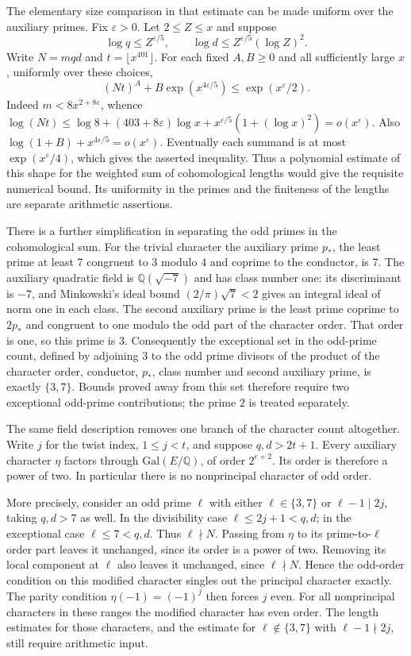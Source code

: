\documentclass[11pt]{amsart}
\theoremstyle{definition}
\theoremstyle{remark}
\begin{document}
The elementary size comparison in that estimate can be made uniform
over the auxiliary primes. Fix $\varepsilon>0$. Let $2\le Z\le x$ and
suppose
\[
 \log q\le Z^{\varepsilon/5},\qquad
 \log d\le Z^{\varepsilon/5}(\log Z)^2 .
\]
Write $N=mqd$ and $t=\lfloor x^{401}\rfloor$. For each fixed $A,B\ge0$
and all sufficiently large $x$, uniformly over these choices,
\[
 (Nt)^A+B\exp(x^{4\varepsilon/5})
       \le \exp(x^\varepsilon/2).
\]
Indeed $m<8x^{2+8\varepsilon}$, whence
$\log(Nt)\le\log8+(403+8\varepsilon)\log x+
x^{\varepsilon/5}(1+(\log x)^2)=o(x^\varepsilon)$.
Also $\log(1+B)+x^{4\varepsilon/5}=o(x^\varepsilon)$.
Eventually each summand is at most $\exp(x^\varepsilon/4)$,
which gives the asserted inequality. Thus a polynomial estimate of
this shape for the weighted sum of cohomological lengths would give
the requisite numerical bound. Its uniformity in the primes and
the finiteness of the lengths are separate arithmetic assertions.

There is a further simplification in separating the odd primes in
the cohomological sum. For the trivial character the auxiliary prime
$p_*$, the least prime at least $7$ congruent to $3$ modulo $4$ and
coprime to the conductor, is $7$. The auxiliary quadratic field is
$\mathbb Q(\sqrt{-7})$ and has class number one: its discriminant is
$-7$, and Minkowski's ideal bound $(2/\pi)\sqrt7<2$ gives an integral
ideal of norm one in each class. The second auxiliary prime is the
least prime coprime to $2p_*$ and congruent to one modulo the odd part
of the character order. That order is one, so this prime is $3$.
Consequently the exceptional set in the odd-prime count, defined by
adjoining $3$ to the odd prime divisors of the product of the character
order, conductor, $p_*$, class number and second auxiliary prime,
is exactly $\{3,7\}$. Bounds proved away from this set therefore
require two exceptional odd-prime contributions; the prime $2$ is
treated separately.

The same field description removes one branch of the character
count altogether. Write $j$ for the twist index, $1\le j<t$, and
suppose $q,d>2t+1$. Every auxiliary character $\eta$ factors through
$\mathrm{Gal}(E/\mathbb Q)$, of order $2^{e+2}$. Its order is
therefore a power of two. In particular there is no nonprincipal
character of odd order.

More precisely, consider an odd prime $\ell$ with either
$\ell\in\{3,7\}$ or $\ell-1\mid 2j$, taking $q,d>7$ as well.
In the divisibility case $\ell\le2j+1<q,d$; in the exceptional case
$\ell\le7<q,d$. Thus $\ell\nmid N$. Passing from $\eta$ to its
prime-to-$\ell$ order part leaves it unchanged, since its order is
a power of two. Removing its local component at $\ell$ also leaves it
unchanged, since $\ell\nmid N$. Hence the odd-order condition on this
modified character singles out the principal character exactly.
The parity condition $\eta(-1)=(-1)^j$ then forces $j$ even.
For all nonprincipal characters in these ranges the modified character
has even order. The length estimates for those characters, and the
estimate for $\ell\notin\{3,7\}$ with $\ell-1\nmid2j$, still require
arithmetic input.
\end{document}

